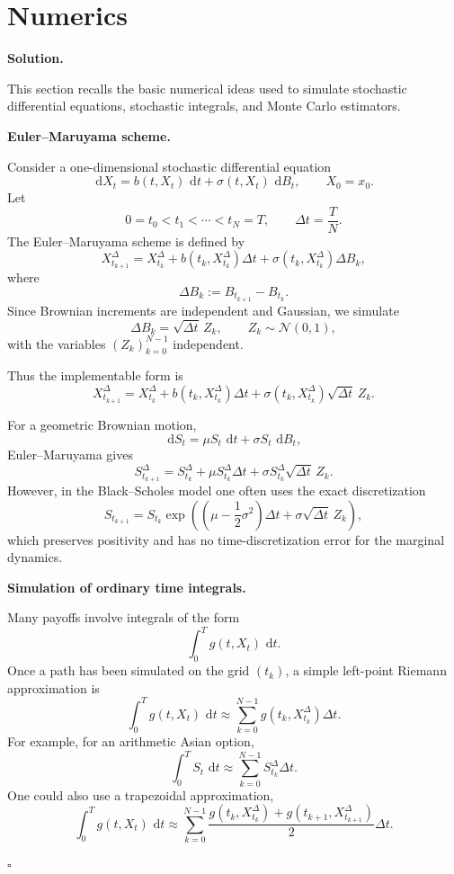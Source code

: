 \documentclass[11pt]{article}
\theoremstyle{plain}
\newcommand{\dd}{\,\mathrm{d}}
\newcommand{\1}{\mathbf{1}}
\theoremstyle{definition}
\newenvironment{solution}
{\par\medskip\noindent\textbf{Solution.}\par\medskip}
{\hfill$\square$\par\medskip}
\newenvironment{solutionpart}[1]
{\par\medskip\noindent\textbf{#1.}\par\smallskip}
{\par\medskip}
\begin{document}
\section{Numerics}
\begin{solution}
This section recalls the basic numerical ideas used to simulate stochastic differential equations,
stochastic integrals, and Monte Carlo estimators.

\begin{solutionpart}{Euler--Maruyama scheme}

Consider a one-dimensional stochastic differential equation
\[
\dd X_t=b(t,X_t)\,\dd t+\sigma(t,X_t)\,\dd B_t,
\qquad X_0=x_0.
\]
Let
\[
0=t_0<t_1<\cdots<t_N=T,
\qquad
\Delta t=\frac{T}{N}.
\]
The Euler--Maruyama scheme is defined by
\[
\boxed{
X_{t_{k+1}}^{\Delta}
=
X_{t_k}^{\Delta}
+
b(t_k,X_{t_k}^{\Delta})\Delta t
+
\sigma(t_k,X_{t_k}^{\Delta})\Delta B_k,
}
\]
where
\[
\Delta B_k:=B_{t_{k+1}}-B_{t_k}.
\]
Since Brownian increments are independent and Gaussian, we simulate
\[
\Delta B_k=\sqrt{\Delta t}\,Z_k,
\qquad
Z_k\sim\mathcal N(0,1),
\]
with the variables $(Z_k)_{k=0}^{N-1}$ independent.

Thus the implementable form is
\[
\boxed{
X_{t_{k+1}}^{\Delta}
=
X_{t_k}^{\Delta}
+
b(t_k,X_{t_k}^{\Delta})\Delta t
+
\sigma(t_k,X_{t_k}^{\Delta})\sqrt{\Delta t}\,Z_k.
}
\]

For a geometric Brownian motion,
\[
\dd S_t=\mu S_t\,\dd t+\sigma S_t\,\dd B_t,
\]
Euler--Maruyama gives
\[
S_{t_{k+1}}^{\Delta}
=
S_{t_k}^{\Delta}
+
\mu S_{t_k}^{\Delta}\Delta t
+
\sigma S_{t_k}^{\Delta}\sqrt{\Delta t}\,Z_k.
\]
However, in the Black--Scholes model one often uses the exact discretization
\[
\boxed{
S_{t_{k+1}}
=
S_{t_k}
\exp\left(
\left(\mu-\frac12\sigma^2\right)\Delta t
+
\sigma\sqrt{\Delta t}\,Z_k
\right),
}
\]
which preserves positivity and has no time-discretization error for the marginal dynamics.
\end{solutionpart}

\begin{solutionpart}{Simulation of ordinary time integrals}

Many payoffs involve integrals of the form
\[
\int_0^T g(t,X_t)\,\dd t.
\]
Once a path has been simulated on the grid $(t_k)$, a simple left-point Riemann approximation is
\[
\boxed{
\int_0^T g(t,X_t)\,\dd t
\approx
\sum_{k=0}^{N-1} g(t_k,X_{t_k}^{\Delta})\Delta t.
}
\]
For example, for an arithmetic Asian option,
\[
\int_0^T S_t\,\dd t
\approx
\sum_{k=0}^{N-1} S_{t_k}^{\Delta}\Delta t.
\]
One could also use a trapezoidal approximation,
\[
\int_0^T g(t,X_t)\,\dd t
\approx
\sum_{k=0}^{N-1}
\frac{
g(t_k,X_{t_k}^{\Delta})
+
g(t_{k+1},X_{t_{k+1}}^{\Delta})
}{2}
\Delta t.
\]
\end{solutionpart}


\end{solution}
\end{document}
